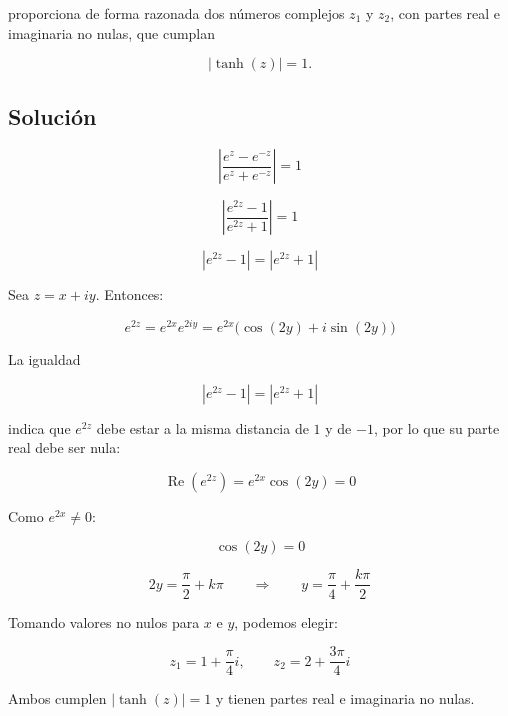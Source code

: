 \documentclass[fleqn]{article}
\begin{document}
		proporciona de forma razonada dos números complejos $z_1$ y $z_2$, con partes real e imaginaria no nulas, que cumplan

		\[
		|\tanh(z)|=1.
		\]

		\subsection{Solución}

		\[
		\left|
		\frac{e^z-e^{-z}}{e^z+e^{-z}}
		\right|
		=1
		\]

		\[
		\left|
		\frac{e^{2z}-1}{e^{2z}+1}
		\right|
		=1
		\]

		\[
		|e^{2z}-1|
		=
		|e^{2z}+1|
		\]

		Sea $z=x+iy$. Entonces:

		\[
		e^{2z}
		=
		e^{2x}e^{2iy}
		=
		e^{2x}\bigl(\cos(2y)+i\sin(2y)\bigr)
		\]

		La igualdad

		\[
		|e^{2z}-1|=|e^{2z}+1|
		\]

		indica que $e^{2z}$ debe estar a la misma distancia de $1$ y de $-1$, por lo que su parte real debe ser nula:

		\[
		\operatorname{Re}(e^{2z})
		=
		e^{2x}\cos(2y)
		=
		0
		\]

		Como $e^{2x}\neq 0$:

		\[
		\cos(2y)=0
		\]

		\[
		2y=\frac{\pi}{2}+k\pi
		\qquad\Longrightarrow\qquad
		y=\frac{\pi}{4}+\frac{k\pi}{2}
		\]

		Tomando valores no nulos para $x$ e $y$, podemos elegir:

		\[
		\boxed{
		z_1=1+\frac{\pi}{4}i,
		\qquad
		z_2=2+\frac{3\pi}{4}i
		}
		\]

		Ambos cumplen $|\tanh(z)|=1$ y tienen partes real e imaginaria no nulas.
\end{document}
